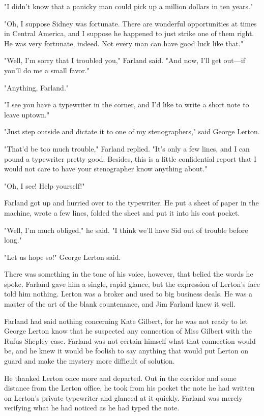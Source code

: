 \documentclass{novel}
\begin{document}
"I didn't know that a panicky man could pick up a million dollars in ten years."

"Oh, I suppose Sidney was fortunate. There are wonderful opportunities at times in Central America, and I suppose he happened to just strike one of them right. He was very fortunate, indeed. Not every man can have good luck like that."

"Well, I'm sorry that I troubled you," Farland said. "And now, I'll get out---if you'll do me a small favor."

"Anything, Farland."

"I see you have a typewriter in the corner, and I'd like to write a short note to leave uptown."

"Just step outside and dictate it to one of my stenographers," said George Lerton.

"That'd be too much trouble," Farland replied. "It's only a few lines, and I can pound a typewriter pretty good. Besides, this is a little confidential report that I would not care to have your stenographer know anything about."

"Oh, I see! Help yourself!"

Farland got up and hurried over to the typewriter. He put a sheet of paper in the machine, wrote a few lines, folded the sheet and put it into his coat pocket.

"Well, I'm much obliged," he said. "I think we'll have Sid out of trouble before long."

"Let us hope so!" George Lerton said.

There was something in the tone of his voice, however, that belied the words he spoke. Farland gave him a single, rapid glance, but the expression of Lerton's face told him nothing. Lerton was a broker and used to big business deals. He was a master of the art of the blank countenance, and Jim Farland knew it well.

Farland had said nothing concerning Kate Gilbert, for he was not ready to let George Lerton know that he suspected any connection of Miss Gilbert with the Rufus Shepley case. Farland was not certain himself what that connection would be, and he knew it would be foolish to say anything that would put Lerton on guard and make the mystery more difficult of solution.

He thanked Lerton once more and departed. Out in the corridor and some distance from the Lerton office, he took from his pocket the note he had written on Lerton's private typewriter and glanced at it quickly. Farland was merely verifying what he had noticed as he had typed the note.
\end{document}
